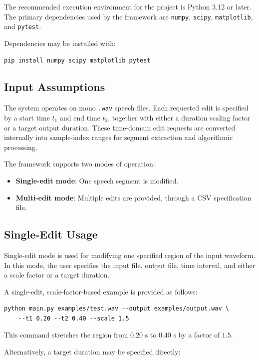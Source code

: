 \documentclass{article}
\begin{document}
The recommended execution environment for the project is Python 3.12 or later. The primary dependencies used by the framework are \texttt{numpy}, \texttt{scipy}, \texttt{matplotlib}, and \texttt{pytest}.

Dependencies may be installed with:

\begin{verbatim}
pip install numpy scipy matplotlib pytest
\end{verbatim}

\subsection{Input Assumptions}

The system operates on mono \texttt{.wav} speech files. Each requested edit is specified by a start time \(t_1\) and end time \(t_2\), together with either a duration scaling factor or a target output duration. These time-domain edit requests are converted internally into sample-index ranges for segment extraction and algorithmic processing.

The framework supports two modes of operation:
\begin{itemize}
    \item \textbf{Single-edit mode}: One speech segment is modified.
    \item \textbf{Multi-edit mode}: Multiple edits are provided, through a CSV specification file.
\end{itemize}

\subsection{Single-Edit Usage}

Single-edit mode is used for modifying one specified region of the input waveform. In this mode, the user specifies the input file, output file, time interval, and either a scale factor or a target duration.

A single-edit, scale-factor-based example is provided as follows:

\begin{verbatim}
python main.py examples/test.wav --output examples/output.wav \
    --t1 0.20 --t2 0.40 --scale 1.5
\end{verbatim}

This command stretches the region from \(0.20\) s to \(0.40\) s by a factor of \(1.5\).

Alternatively, a target duration may be specified directly:
\end{document}
